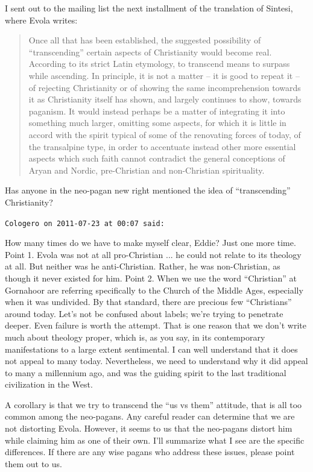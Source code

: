 \begin{footnotesize}
\begin{sffamily}
I sent out to the mailing list the next installment of the translation of Sintesi, where Evola writes:

\begin{quote}\footnotesize
Once all that has been established, the suggested possibility of ``transcending'' certain aspects of Christianity would become real. According to its strict Latin etymology, to transcend means to surpass while ascending. In principle, it is not a matter -- it is good to repeat it -- of rejecting Christianity or of showing the same incomprehension towards it as Christianity itself has shown, and largely continues to show, towards paganism. It would instead perhaps be a matter of integrating it into something much larger, omitting some aspects, for which it is little in accord with the spirit typical of some of the renovating forces of today, of the transalpine type, in order to accentuate instead other more essential aspects which such faith cannot contradict the general conceptions of Aryan and Nordic, pre-Christian and non-Christian spirituality.
\end{quote}


Has anyone in the neo-pagan new right mentioned the idea of ``transcending'' Christianity?

\hfill

\texttt{Cologero on 2011-07-23 at 00:07 said:}

How many times do we have to make myself clear, Eddie? Just one more time. Point 1. Evola was not at all pro-Christian ... he could not relate to its theology at all. But neither was he anti-Christian. Rather, he was non-Christian, as though it never existed for him. Point 2. When we use the word ``Christian'' at Gornahoor are referring specifically to the Church of the Middle Ages, especially when it was undivided. By that standard, there are precious few ``Christians'' around today. Let's not be confused about labels; we're trying to penetrate deeper. Even failure is worth the attempt. That is one reason that we don't write much about theology proper, which is, as you say, in its contemporary manifestations to a large extent sentimental. I can well understand that it does not appeal to many today. Nevertheless, we need to understand why it did appeal to many a millennium ago, and was the guiding spirit to the last traditional civilization in the West.

A corollary is that we try to transcend the ``us vs them'' attitude, that is all too common among the neo-pagans. Any careful reader can determine that we are not distorting Evola. However, it seems to us that the neo-pagans distort him while claiming him as one of their own. I'll summarize what I see are the specific differences. If there are any wise pagans who address these issues, please point them out to us.


\end{sffamily}
\end{footnotesize}
